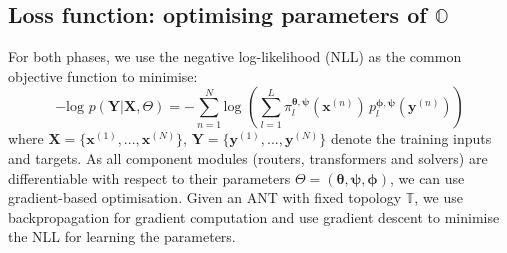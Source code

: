 \subsection{Loss function: optimising parameters of \texorpdfstring{$\mathbb{O}$}{O}}\label{sec:graddescent}
For both phases, we use the negative log-likelihood (NLL) as the common objective function to minimise: 
$$-\text{log }p(\mathbf{Y}|\mathbf{X}, \Theta) = -\sum_{n=1}^N\text{log }(\sum_{l=1}^{L} \pi_{l}^{\boldsymbol{\theta}, \boldsymbol{\psi}}(\mathbf{x}^{(n)})\,
p_{l}^{\boldsymbol{\phi}, \boldsymbol{\psi}}(\mathbf{y}^{(n)}))$$ where $\mathbf{X} = \{\mathbf{x}^{(1)}, ..., \mathbf{x}^{(N)}\}$, $\mathbf{Y} = \{\mathbf{y}^{(1)}, ..., \mathbf{y}^{(N)}\}$ denote the training inputs and targets. As all component modules (routers, transformers and solvers) are differentiable with respect to their parameters $\Theta = (\boldsymbol{\theta}, \boldsymbol{\psi}, \boldsymbol{\phi})$, we can use gradient-based optimisation. Given an ANT with fixed topology  $\mathbb{T}$, we use backpropagation \cite{rumelhart1986learning} for gradient computation and use gradient descent to minimise the NLL for learning the parameters.


